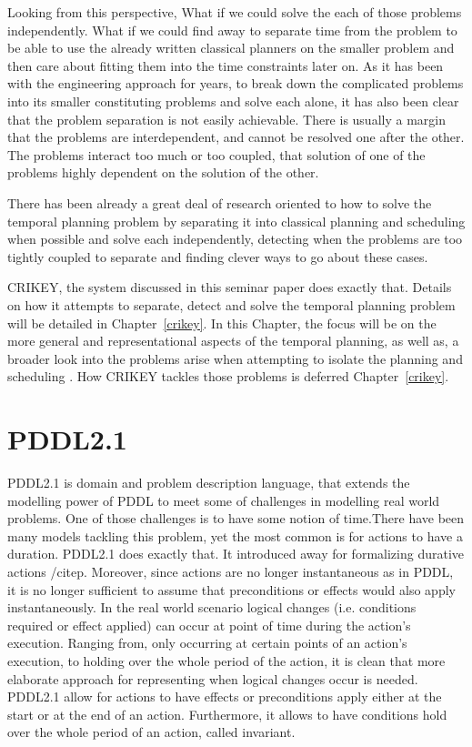 \documentclass
[a4paper
,english
,parskip=half
,bibliography=totoc
]{scrreprt}
\begin{document}
    Looking from this perspective, What if we could solve the each of those problems independently. What if we could find away to separate time from the problem to be able to use the already written classical planners on the smaller problem and then care about fitting them into the time constraints later on. As it has been with the engineering approach for years, to break down the complicated problems into its smaller constituting problems and solve each alone, it has also been clear that the problem separation is not easily achievable. There is usually a margin that the problems are interdependent, and cannot be resolved one after the other. The problems interact too much or too coupled, that solution of one of the problems highly dependent on the solution of the other.

    There has been already a great deal of research oriented to how to solve the temporal planning problem by separating it into classical planning and scheduling when possible and solve each independently, detecting when the problems are too tightly coupled to separate and finding clever ways to go about these cases.

    CRIKEY, the system discussed in this seminar paper does exactly that. Details on how it attempts to separate, detect and solve the temporal planning problem will be detailed in Chapter~\ref{crikey}. In this Chapter, the focus will be on the more general and representational aspects of the temporal planning, as well as, a broader look into the problems arise when attempting to isolate the planning and scheduling . How CRIKEY tackles those problems is deferred Chapter~\ref{crikey}.  

    
    \section{PDDL2.1} 
    PDDL2.1 is domain and problem description language, that extends the modelling power of PDDL \citep{} to meet some of challenges in modelling real world problems. One of those challenges is to have some notion of time.There have been many models tackling this problem, yet the most common is for actions to have a duration. PDDL2.1 does exactly that. It introduced away for formalizing durative actions /citep{}.
    Moreover, since actions are no longer instantaneous as in PDDL, it is no longer sufficient to assume that preconditions or effects would also apply instantaneously. In the real world scenario logical changes (i.e. conditions required or effect applied) can occur at point of time during the action's execution. Ranging from, only occurring at certain points of an action's execution, to holding over the whole period of the action, it is clean that more elaborate approach for representing when logical changes occur is needed. 
    PDDL2.1 allow for actions to have effects or preconditions apply either at the start or at the end of an action. Furthermore, it allows to have conditions hold over the whole period of an action, called invariant.
\end{document}
